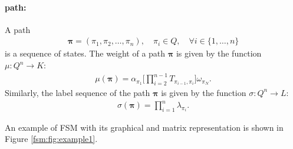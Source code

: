 \paragraph{path:} A path
\begin{align}
    \boldsymbol{\pi} = (\pi_1, \pi_2, \dots, \pi_n), \quad
        \pi_i \in Q, \quad \forall i \in \{1, \dots, n \}
\end{align}
is a sequence of states. The weight of a path $\boldsymbol{\pi}$ is
given by the function $\mu: Q^n \rightarrow K$:
\begin{align}
    \mu(\boldsymbol{\pi}) = \alpha_{\pi_1} \Big[
        \prod_{i=2}^{n-1} T_{\pi_{i-1},\pi_i} \Big] \omega_{\pi_N}.
\end{align}
Similarly, the label sequence of the path $\boldsymbol{\pi}$ is given
by the function $\sigma: Q^n \rightarrow L$:
\begin{align}
    \sigma(\boldsymbol{\pi}) = \prod_{i=1}^n \lambda_{\pi_i}.
\end{align}

An example of FSM with its graphical and matrix representation is
shown in Figure \ref{fsm:fig:example1}.

